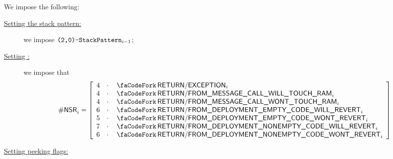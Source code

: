 We impose the following:
\begin{description}
	\item[\underline{Setting the stack pattern:}]
		we impose $\texttt{(2,0)-}\texttt{StackPattern}_{i - 1}$;
	\item[\underline{Setting \nonStackRows{}:}]
		we impose that
		\[
			\nonStackRows_{i}
			=
			\left[ \begin{array}{rcl}
				4 & \cdot & \scenReturnException                                _{i} \\
				4 & \cdot & \scenReturnFromMessageCallWillTouchRam              _{i} \\
				4 & \cdot & \scenReturnFromMessageCallWontTouchRam              _{i} \\
				6 & \cdot & \scenReturnFromDeploymentEmptyByteCodeWillRevert    _{i} \\
				5 & \cdot & \scenReturnFromDeploymentEmptyByteCodeWontRevert    _{i} \\
				7 & \cdot & \scenReturnFromDeploymentNonemptyByteCodeWillRevert _{i} \\
				6 & \cdot & \scenReturnFromDeploymentNonemptyByteCodeWontRevert _{i} \\
			\end{array} \right]
		\]
	\item[\underline{Setting peeking flags:}]

\end{description}
